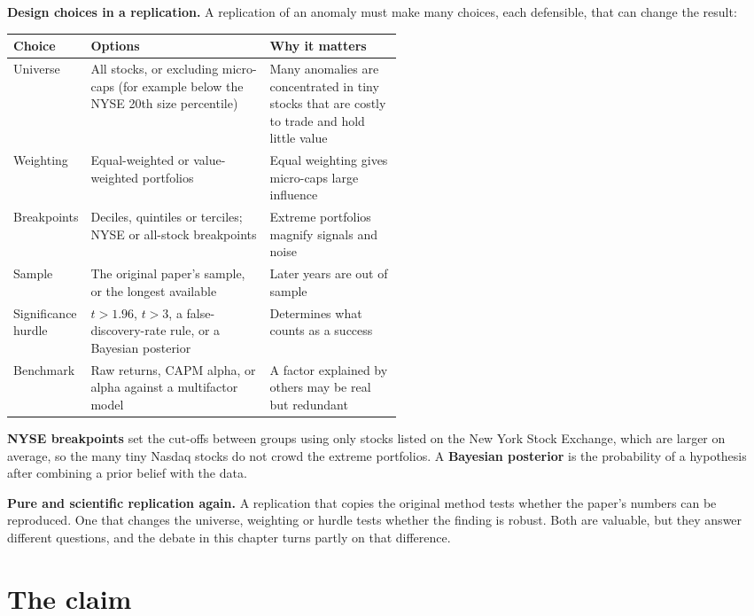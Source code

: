 \textbf{Design choices in a replication.} A replication of an anomaly must make many choices, each defensible, that can change the result:

\begin{center}
\small
\begin{tabularx}{0.9\linewidth}{@{}>{\raggedright\arraybackslash}p{0.17\linewidth}>{\raggedright\arraybackslash}X>{\raggedright\arraybackslash}p{0.34\linewidth}@{}}
\toprule
Choice & Options & Why it matters \\
\midrule
Universe & All stocks, or excluding micro-caps (for example below the NYSE 20th size percentile) & Many anomalies are concentrated in tiny stocks that are costly to trade and hold little value \\
Weighting & Equal-weighted or value-weighted portfolios & Equal weighting gives micro-caps large influence \\
Breakpoints & Deciles, quintiles or terciles; NYSE or all-stock breakpoints & Extreme portfolios magnify signals and noise \\
Sample & The original paper's sample, or the longest available & Later years are out of sample \\
Significance hurdle & $t > 1.96$, $t > 3$, a false-discovery-rate rule, or a Bayesian posterior & Determines what counts as a success \\
Benchmark & Raw returns, CAPM alpha, or alpha against a multifactor model & A factor explained by others may be real but redundant \\
\bottomrule
\end{tabularx}
\end{center}

\textbf{NYSE breakpoints} set the cut-offs between groups using only stocks listed on the New York Stock Exchange, which are larger on average, so the many tiny Nasdaq stocks do not crowd the extreme portfolios. A \textbf{Bayesian posterior} is the probability of a hypothesis after combining a prior belief with the data.

\textbf{Pure and scientific replication again.} A replication that copies the original method tests whether the paper's numbers can be reproduced. One that changes the universe, weighting or hurdle tests whether the finding is robust. Both are valuable, but they answer different questions, and the debate in this chapter turns partly on that difference.

\section{The claim}
\label{sec:10-claim}

